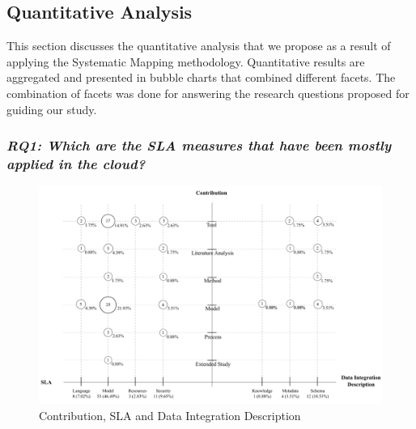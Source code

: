 \subsection{Quantitative Analysis}\label{sec:qanalysis}

This section discusses the quantitative analysis that we propose as a result of applying the Systematic Mapping methodology.
Quantitative results are aggregated and presented in bubble charts that combined different facets. The combination of facets was done for answering the research questions proposed for guiding our study.


 
\subsubsection{\textit{RQ1: Which are the SLA measures that have been mostly applied  in the cloud?}}
\begin{figure}[h!]
\centering
\includegraphics[scale=0.45]{figs/bubble-charts/Contribution-SLA-DIdescription.pdf} 
\caption{Contribution, SLA and Data Integration Description}\label{fig:facet1}
\end{figure}

